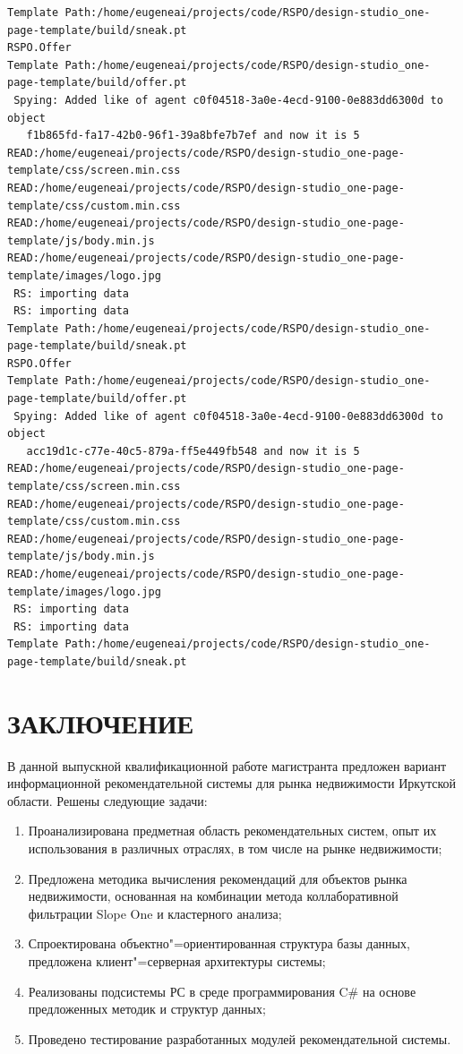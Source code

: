 \documentclass[a4paper,14pt,openany,final]{extreport} %
\def\oldcaption{} \let\oldcaption=\caption
\def\caption{\stepcounter{captionsnum}\oldcaption}
\begin{document}
{\begin{pzlisting}
  \caption{Журнал отладки и тестирования рекомендательной системы в режиме выработки рекомендаций}\label{lst:log}
\begin{verbatim}
Template Path:/home/eugeneai/projects/code/RSPO/design-studio_one-page-template/build/sneak.pt
RSPO.Offer
Template Path:/home/eugeneai/projects/code/RSPO/design-studio_one-page-template/build/offer.pt
 Spying: Added like of agent c0f04518-3a0e-4ecd-9100-0e883dd6300d to object
   f1b865fd-fa17-42b0-96f1-39a8bfe7b7ef and now it is 5
READ:/home/eugeneai/projects/code/RSPO/design-studio_one-page-template/css/screen.min.css
READ:/home/eugeneai/projects/code/RSPO/design-studio_one-page-template/css/custom.min.css
READ:/home/eugeneai/projects/code/RSPO/design-studio_one-page-template/js/body.min.js
READ:/home/eugeneai/projects/code/RSPO/design-studio_one-page-template/images/logo.jpg
 RS: importing data
 RS: importing data
Template Path:/home/eugeneai/projects/code/RSPO/design-studio_one-page-template/build/sneak.pt
RSPO.Offer
Template Path:/home/eugeneai/projects/code/RSPO/design-studio_one-page-template/build/offer.pt
 Spying: Added like of agent c0f04518-3a0e-4ecd-9100-0e883dd6300d to object
   acc19d1c-c77e-40c5-879a-ff5e449fb548 and now it is 5
READ:/home/eugeneai/projects/code/RSPO/design-studio_one-page-template/css/screen.min.css
READ:/home/eugeneai/projects/code/RSPO/design-studio_one-page-template/css/custom.min.css
READ:/home/eugeneai/projects/code/RSPO/design-studio_one-page-template/js/body.min.js
READ:/home/eugeneai/projects/code/RSPO/design-studio_one-page-template/images/logo.jpg
 RS: importing data
 RS: importing data
Template Path:/home/eugeneai/projects/code/RSPO/design-studio_one-page-template/build/sneak.pt
\end{verbatim}
\end{pzlisting}

\chapter*{ЗАКЛЮЧЕНИЕ}
В данной выпускной квалификационной работе магистранта предложен вариант информационной рекомендательной системы для рынка недвижимости Иркутской области. Решены следующие задачи:
\begin{enumerate}
\item Проанализирована предметная область рекомендательных систем, опыт их использования в различных отраслях, в том числе на рынке недвижимости;
\item Предложена методика вычисления рекомендаций для объектов рынка недвижимости, основанная на комбинации метода коллаборативной фильтрации \foreignlanguage{english}{Slope One} и кластерного анализа;
\item Спроектирована объектно"=ориентированная структура базы данных, предложена клиент"=серверная архитектуры системы;
\item Реализованы подсистемы РС в среде программирования C\# на основе предложенных методик и структур данных;
\item Проведено тестирование разработанных модулей рекомендательной системы.
\end{enumerate}

}
\end{document}
